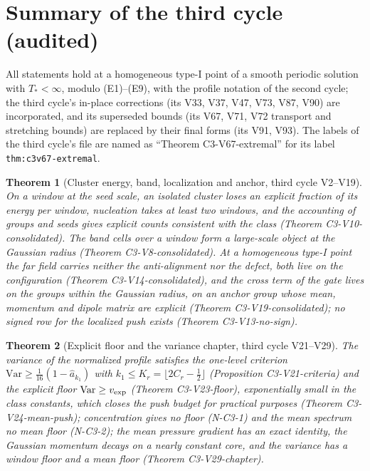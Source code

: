 \documentclass[11pt]{article}
\theoremstyle{plain}
\newtheorem{theorem}{Theorem}[section]
\theoremstyle{definition}
\theoremstyle{remark}
\begin{document}
\section{Summary of the third cycle (audited)}
\label{sec:c4v1-cycle3}

All statements hold at a homogeneous type-I point of a smooth
periodic solution with \(T_*<\infty\), modulo (E1)--(E9), with the profile
notation of the second cycle; the third cycle's in-place corrections
(its V33, V37, V47, V73, V87, V90) are incorporated, and its
superseded bounds (its V67, V71, V72 transport and stretching
bounds) are replaced by their final forms (its V91, V93).  The
labels of the third cycle's file are named as ``Theorem C3-V67-extremal''
for its label \texttt{thm:c3v67-extremal}.

\begin{theorem}[Cluster energy, band, localization and anchor, third cycle V2--V19]
\label{thm:c4v1-early}
On a window at the seed scale, an isolated cluster loses an explicit
fraction of its energy per window, nucleation takes at least two
windows, and the accounting of groups and seeds gives explicit
counts consistent with the class (Theorem C3-V10-consolidated).
The band cells over a window form a large-scale object at the
Gaussian radius (Theorem C3-V8-consolidated).  At a homogeneous
type-I point the far field carries neither the anti-alignment nor
the defect, both live on the configuration
(Theorem C3-V14-consolidated), and the cross term of the gate
lives on the groups within the Gaussian radius, on an anchor group
whose mean, momentum and dipole matrix are explicit
(Theorem C3-V19-consolidated); no signed row for the localized
push exists (Theorem C3-V13-no-sign).
\end{theorem}

\begin{theorem}[Explicit floor and the variance chapter, third cycle V21--V29]
\label{thm:c4v1-variance}
The variance of the normalized profile satisfies the one-level
criterion \(\mathrm{Var}\ge\frac1{16}(1-\hat a_{k_1})\) with \(k_1\le K_r=\lfloor2C_r-\frac12\rfloor\)
(Proposition C3-V21-criteria) and the explicit floor
\(\mathrm{Var}\ge v_{\rm exp}\) (Theorem C3-V23-floor), exponentially small in
the class constants, which closes the push budget for practical
purposes (Theorem C3-V24-mean-push); concentration gives no
floor (N-C3-1) and the mean spectrum no mean floor (N-C3-2); the mean
pressure gradient has an exact identity, the Gaussian momentum
decays on a nearly constant core, and the variance has a window
floor and a mean floor (Theorem C3-V29-chapter).
\end{theorem}
\end{document}

